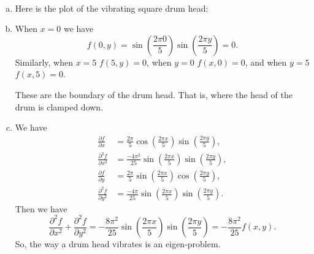 \documentclass[12pt]{article} %
\begin{document}
\begin{solution}~
\begin{enumerate}[(a)]
    \item Here is the plot of the vibrating square drum head:
    \begin{figure}[H]
        \centering
	\def\svgwidth{0.75\columnwidth}
	
    \end{figure}
    \item When $x=0$ we have
    \[
    f(0,y) = \sin\left( \frac{2\pi 0}{5}\right) \sin\left(\frac{2\pi y}{5}\right) = 0.
    \]
    Similarly, when $x=5$ $f(5,y)=0$, when $y=0$ $f(x,0)=0$, and when $y=5$ $f(x,5)=0$.

    These are the boundary of the drum head.  That is, where the head of the drum is clamped down.

    \item We have
    \begin{align*}
        \frac{\partial f}{\partial x} &= \frac{2\pi}{5} \cos \left( \frac{2\pi x}{5} \right) \sin \left( \frac{2\pi y}{5} \right),\\
        \frac{\partial^2 f}{\partial x^2} &= \frac{-4\pi^2}{25} \sin \left( \frac{2\pi x}{5} \right) \sin \left( \frac{2\pi y}{5} \right),\\
        \frac{\partial f}{\partial y} &= \frac{2\pi}{5} \sin \left( \frac{2\pi x}{5} \right) \cos \left( \frac{2\pi y}{5} \right),\\
        \frac{\partial^2 f}{\partial y^2} &= \frac{-4\pi}{25} \sin \left( \frac{2\pi x}{5} \right) \sin \left( \frac{2\pi y}{5} \right).
    \end{align*}
    Then we have
    \[
    \frac{\partial^2 f}{\partial x^2} + \frac{\partial^2 f}{\partial y^2} = -\frac{8\pi^2}{25} \sin \left( \frac{2\pi x}{5} \right) \sin \left( \frac{2\pi y}{5} \right) = -\frac{8\pi^2}{25} f(x,y).
    \]
    So, the way a drum head vibrates is an eigen-problem.
\end{enumerate}
\end{solution}
\end{document}
